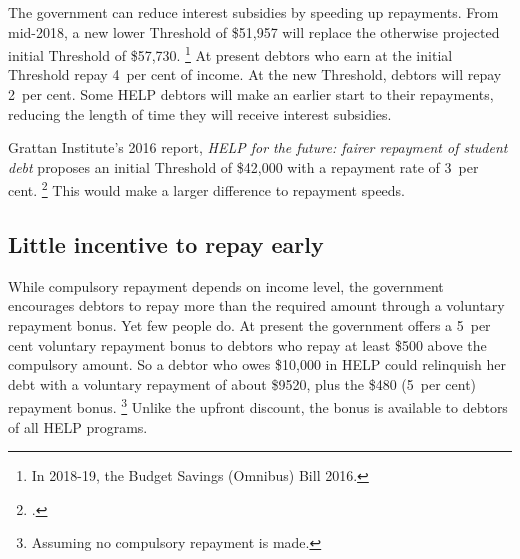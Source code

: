 \documentclass{grattan}
\begin{document}
The government can reduce interest subsidies by speeding up repayments.
From mid-2018, a new lower \gls{Threshold} of \$51,957 will replace the otherwise projected initial \gls{Threshold} of \$57,730.%
   \footnote{In 2018-19, the Budget Savings (Omnibus) Bill 2016.} 
At present debtors who earn at the initial \gls{Threshold} repay 4~per cent of income.
At the new \gls{Threshold}, debtors will repay 2~per cent.
Some \gls{HELP} debtors will make an earlier start to their repayments, reducing the length of time they will receive interest subsidies.

Grattan Institute's 2016 report, \emph{HELP for the future: fairer repayment of student debt} proposes an initial \gls{Threshold} of \$42,000 with a repayment rate of 3~per cent.%
\footcite{Norton2016HELPfuturefairer} 
This would make a larger difference to repayment speeds.

\subsection{Little incentive to repay early}\label{little-incentive-to-repay-early}

While compulsory repayment depends on income level, the government encourages debtors to repay more than the required amount through a voluntary repayment bonus. Yet few people do. 
At present the government offers a 5~per cent voluntary repayment bonus to debtors who repay at least \$500 above the compulsory amount.
So a debtor who owes \$10,000 in \gls{HELP} could relinquish her debt with a voluntary repayment of about \$9520, plus the \$480 (5~per cent) repayment bonus.%
   \footnote{Assuming no compulsory repayment is made.} 
Unlike the upfront discount, the bonus is available to debtors of all \gls{HELP} programs.
\end{document}
